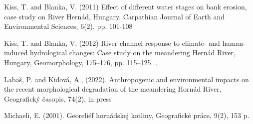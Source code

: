 {Kiss, T. and Blanka, V. (2011) Effect of different water stages on bank erosion, case study on River Hernád, Hungary, Carpathian Journal of Earth and Environmental Sciences, 6(2), pp. 101-108

Kiss, T. and Blanka, V. (2012) River channel response to climate- and human-induced hydrological changes: Case study on the meandering Hernád River, Hungary, Geomorphology, 175–176, pp. 115–125. .

Labaš, P. and Kidová, A., (2022). Anthropogenic and environmental impacts on the recent morphological degradation of the meandering Hornád River, Geografický časopis,  74(2), in press

Michaeli, E. (2001). Georeliéf hornádskej kotliny, Geografické práce, 9(2), 153 p.
}

